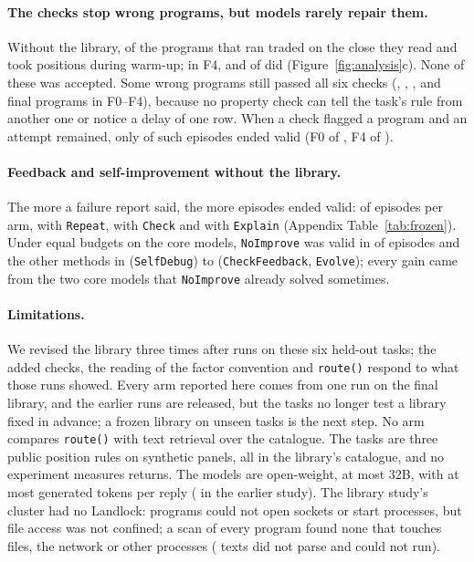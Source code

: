 \paragraph{The checks stop wrong programs, but models rarely repair them.}
Without the library, \FixFZeroFailedExecutionLag{} of the \FixFZeroRan{} programs that ran traded
on the close they read and \FixFZeroFailedWarmupRowsZero{} took positions during warm-up; in F4,
\FixFFourFailedExecutionLag{} and \FixFFourFailedWarmupRowsZero{} of \FixFFourRan{} did
(Figure~\ref{fig:analysis}c). None of these was accepted. Some wrong programs still passed all
six checks (\FixFZeroAcceptedWrong, \FixFOneAcceptedWrong, \FixFTwoAcceptedWrong,
\FixFThreeAcceptedWrong{} and \FixFFourAcceptedWrong{} final programs in F0--F4), because no
property check can tell the task's rule from another one or notice a delay of one row. When a
check flagged a program and an attempt remained, only \FixFlaggedThenValid{} of
\FixFlaggedRetry{} such episodes ended valid (F0 \FixFZeroFlaggedThenValid{} of
\FixFZeroFlaggedRetry, F4 \FixFFourFlaggedThenValid{} of \FixFFourFlaggedRetry).

\paragraph{Feedback and self-improvement without the library.}
The more a failure report said, the more episodes ended valid: of \FrozenArm{} episodes per
arm, \FrozenRepeat{} with \texttt{Repeat}, \FrozenCheck{} with \texttt{Check} and
\FrozenExplain{} with \texttt{Explain} (Appendix Table~\ref{tab:frozen}). Under equal budgets
on the core models, \texttt{NoImprove} was valid in \SNoLibNoImprove{} of \SNoLibEpisodes{} episodes and the other
methods in \SNoLibSelfDebug{} (\texttt{SelfDebug}) to \SNoLibCheckFeedback{}
(\texttt{CheckFeedback}, \texttt{Evolve}); every gain came from the two core models that
\texttt{NoImprove} already solved sometimes.

\paragraph{Limitations.}
We revised the library three times after runs on these six held-out tasks; the added checks,
the reading of the factor convention and \texttt{route()} respond to what those runs showed.
Every arm reported here comes from one run on the final library, and the earlier runs are
released, but the tasks no longer test a library fixed in advance; a frozen library on unseen
tasks is the next step. No arm compares \texttt{route()} with text retrieval over the catalogue.
The tasks are three public position rules on synthetic panels, all in the library's catalogue,
and no experiment measures returns. The models are open-weight, at most 32B, with at most
\FixOutputCap{} generated tokens per reply (\StudyOutputCap{} in the earlier study). The
library study's cluster had no Landlock: programs could not open sockets or start processes, but
file access was not confined; a scan of every program found none that touches files, the
network or other processes (\FixScanNotPython{} texts did not parse and could not run).
